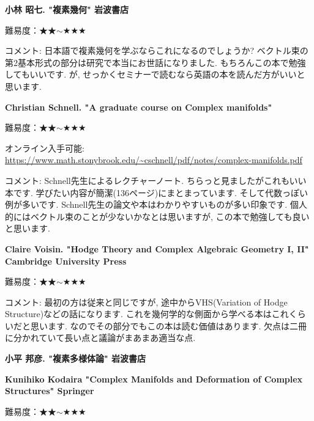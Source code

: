 \textbf{小林 昭七. "複素幾何" 岩波書店}  \vspace{-6pt} 

難易度：★★$\sim$★★★ \vspace{-6pt} 

コメント: 日本語で複素幾何を学ぶならこれになるのでしょうか? 
ベクトル束の第2基本形式の部分は研究で本当にお世話になりました. 
もちろんこの本で勉強してもいいです.  が, せっかくセミナーで読むなら英語の本を読んだ方がいいと思います. 
\vspace{8pt}

\textbf{Christian Schnell. "A graduate course on Complex manifolds" }  \vspace{-6pt} 

難易度：★★$\sim$★★★ \vspace{-6pt} 

オンライン入手可能: \url{https://www.math.stonybrook.edu/~cschnell/pdf/notes/complex-manifolds.pdf} \vspace{-6pt} 

コメント: Schnell先生によるレクチャーノート. ちらっと見ましたがこれもいい本です. 学びたい内容が簡潔(136ページ)にまとまっています. そして代数っぽい例が多いです. Schnell先生の論文や本はわかりやすいものが多い印象です.
個人的にはベクトル束のことが少ないかなとは思いますが, この本で勉強しても良いと思います.  
 
\vspace{8pt}


\textbf{Claire Voisin. "Hodge Theory and Complex Algebraic Geometry I, II" Cambridge University Press}  \vspace{-6pt} 

難易度：★★$\sim$★★★ \vspace{-6pt} 

コメント: 最初の方は従来と同じですが, 途中からVHS(Variation of Hodge Structure)などの話になります. これを幾何学的な側面から学べる本はこれくらいだと思います. なのでその部分でもこの本は読む価値はあります. 欠点は二冊に分かれていて長い点と議論がまあまあ適当な点. %
\vspace{8pt}

\textbf{小平 邦彦. "複素多様体論" 岩波書店}\vspace{-6pt}

\textbf{Kunihiko Kodaira "Complex Manifolds and Deformation of Complex Structures" Springer} \vspace{-6pt}

難易度：★★$\sim$★★★ \vspace{-6pt} 

